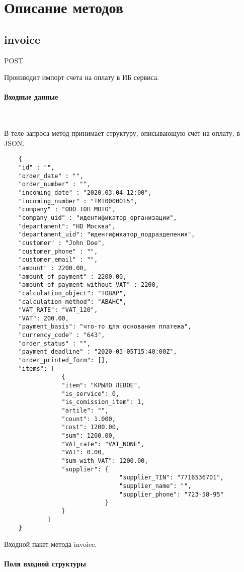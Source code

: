 \documentclass[11pt, a4paper]{article}
\begin{document}
\section{Описание методов}

\subsection{invoice}
POST

Производит импорт счета на оплату в ИБ сервиса.

\paragraph{Входные данные}\

В теле запроса метод принимает структуру, описывающую счет на оплату, в JSON.

\begin{listing}[H]
\begin{verbatim}
	{
	"id" : "", 
	"order_date" : "",
	"order_number" : "",
	"incoming_date" : "2020.03.04 12:00",
	"incoming_number" : "ТМТ0000015",
	"company" : "ООО ТОП МОТО",
	"company_uid" : "идентификатор_организации",
	"departament": "HD Москва",
	"departament_uid": "идентификатор_подразделения",
	"customer" : "John Doe",
	"customer_phone" : "",
	"customer_email" : "",
	"amount" : 2200.00,
	"amount_of_payment" : 2200.00,
	"amount_of_payment_without_VAT" : 2200,
	"calculation_object": "ТОВАР",
	"calculation_method": "АВАНС",
	"VAT_RATE": "VAT_120",
	"VAT": 200.00,
	"payment_basis": "что-то для основания платежа",
	"currency_code" : "643",
	"order_status" : "",
	"payment_deadline" : "2020-03-05T15:40:00Z",
	"order_printed_form": [],
	"items": [
				{
				"item": "КРЫЛО ЛЕВОЕ", 
				"is_service": 0, 
				"is_comission_item": 1, 
				"artile": "", 
				"count": 1.000, 
				"cost": 1200.00, 
				"sum": 1200.00, 
				"VAT_rate": "VAT_NONE", 
				"VAT": 0.00, 
				"sum_with_VAT": 1200.00, 
				"supplier": { 
								"supplier_TIN": "7716536701", 
								"supplier_name": "",
								"supplier_phone": "723-58-95"
							} 
				}
			]
	} 
\end{verbatim}
\caption{Входной пакет метода invoice.} 
\end{listing}

\paragraph{Поля входной структуры}\
\end{document}

